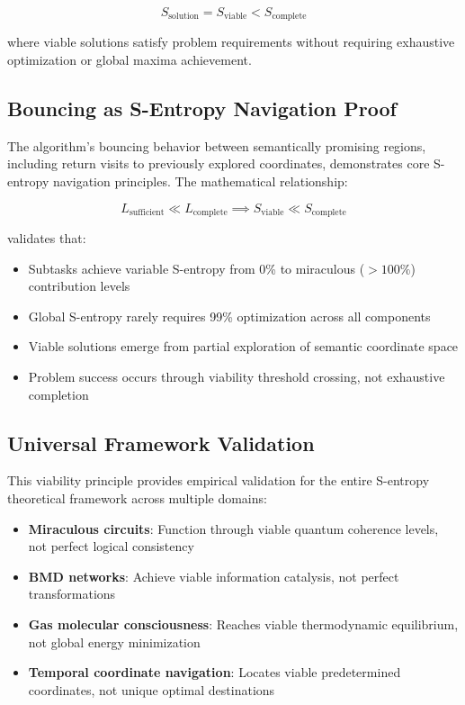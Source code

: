 \documentclass[12pt,a4paper]{article}
\begin{document}
\begin{table}[h]
\begin{equation}
S_{\text{solution}} = S_{\text{viable}} < S_{\text{complete}}
\end{equation}

where viable solutions satisfy problem requirements without requiring exhaustive optimization or global maxima achievement.

\subsection{Bouncing as S-Entropy Navigation Proof}

The algorithm's bouncing behavior between semantically promising regions, including return visits to previously explored coordinates, demonstrates core S-entropy navigation principles. The mathematical relationship:

\begin{equation}
L_{\text{sufficient}} \ll L_{\text{complete}} \implies S_{\text{viable}} \ll S_{\text{complete}}
\end{equation}

validates that:
\begin{itemize}
\item Subtasks achieve variable S-entropy from 0\% to miraculous ($>100\%$) contribution levels
\item Global S-entropy rarely requires 99\% optimization across all components
\item Viable solutions emerge from partial exploration of semantic coordinate space
\item Problem success occurs through viability threshold crossing, not exhaustive completion
\end{itemize}

\subsection{Universal Framework Validation}

This viability principle provides empirical validation for the entire S-entropy theoretical framework across multiple domains:
\begin{itemize}
\item \textbf{Miraculous circuits}: Function through viable quantum coherence levels, not perfect logical consistency
\item \textbf{BMD networks}: Achieve viable information catalysis, not perfect transformations
\item \textbf{Gas molecular consciousness}: Reaches viable thermodynamic equilibrium, not global energy minimization
\item \textbf{Temporal coordinate navigation}: Locates viable predetermined coordinates, not unique optimal destinations
\end{itemize}


\end{table}
\end{document}
